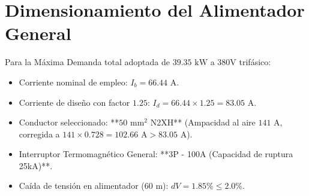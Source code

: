 \section{Dimensionamiento del Alimentador General}
Para la Máxima Demanda total adoptada de $39.35\text{ kW}$ a $380\text{V}$ trifásico:
\begin{itemize}
    \item Corriente nominal de empleo: $I_b = 66.44\text{ A}$.
    \item Corriente de diseño con factor $1.25$: $I_d = 66.44 \times 1.25 = 83.05\text{ A}$.
    \item Conductor seleccionado: **$50\text{ mm}^2$ N2XH** (Ampacidad al aire $141\text{ A}$, corregida a $141 \times 0.728 = 102.66\text{ A} > 83.05\text{ A}$).
    \item Interruptor Termomagnético General: **3P - 100A (Capacidad de ruptura 25kA)**.
    \item Caída de tensión en alimentador ($60\text{ m}$): $dV = 1.85\% \le 2.0\%$.
\end{itemize}
